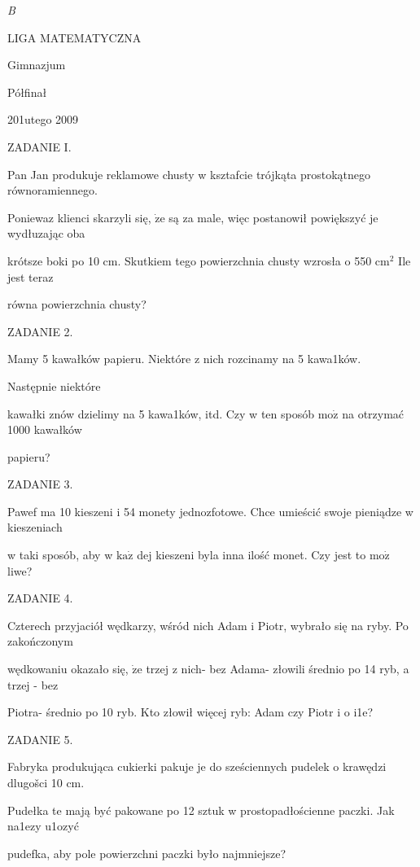 \documentclass[a4paper,12pt]{article}
\begin{document}
{\it B}






LIGA MATEMATYCZNA

Gimnazjum

Półfinał

201utego 2009

ZADANIE I.

Pan Jan produkuje reklamowe chusty w ksztafcie trójkąta prostokątnego równoramiennego.

Poniewaz klienci skarzyli się, $\dot{\mathrm{z}}\mathrm{e}$ są za male, więc postanowił powiększyć je wydłuzając oba

krótsze boki po 10 cm. Skutkiem tego powierzchnia chusty wzrosła o 550 $\mathrm{c}\mathrm{m}^{2}$ Ile jest teraz

równa powierzchnia chusty?

ZADANIE 2.

Mamy 5 kawałków papieru. Niektóre z nich rozcinamy na 5 kawa1ków.

Następnie niektóre

kawałki znów dzielimy na 5 kawa1ków, itd. Czy w ten sposób $\mathrm{m}\mathrm{o}\dot{\mathrm{z}}$ na otrzymać 1000 kawałków

papieru?

ZADANIE 3.

Pawef ma 10 kieszeni i 54 monety jednozfotowe. Chce umieścić swoje pieniądze w kieszeniach

w taki sposób, aby w $\mathrm{k}\mathrm{a}\dot{\mathrm{z}}$ dej kieszeni byla inna ilość monet. Czy jest to $\mathrm{m}\mathrm{o}\dot{\mathrm{z}}$ liwe?

ZADANIE 4.

Czterech przyjaciół wędkarzy, wśród nich Adam i Piotr, wybrało się na ryby. Po zakończonym

wędkowaniu okazało się, $\dot{\mathrm{z}}\mathrm{e}$ trzej z nich- bez Adama- złowili średnio po 14 ryb, a trzej - bez

Piotra- średnio po 10 ryb. Kto złowił więcej ryb: Adam czy Piotr i o i1e?

ZADANIE 5.

Fabryka produkująca cukierki pakuje je do sześciennych pudelek o krawędzi dlugošci 10 cm.

Pudełka te mają być pakowane po 12 sztuk w prostopadłościenne paczki. Jak na1ezy u1ozyć

pudefka, aby pole powierzchni paczki było najmniejsze?
\end{document}
